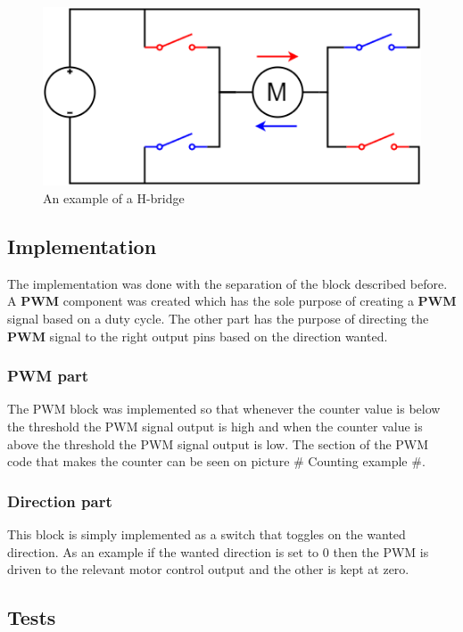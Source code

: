 \begin{figure}[h!]
\centering
\includegraphics[scale=0.5]{Billeder/H-bridge.png}
\caption{ An example of a H-bridge }
\label{fig:H-bridge}
\end{figure}

\subsection{Implementation}

The implementation was done with the separation of the block described before. A \textbf{PWM} component was created which has the sole purpose of creating a \textbf{PWM} signal based on a duty cycle. The other part has the purpose of directing the \textbf{PWM} signal to the right output pins based on the direction wanted.

\subsubsection{PWM part}

The PWM block was implemented so that whenever the counter value is below the threshold the PWM signal output is high and when the counter value is above the threshold the PWM signal output is low. The section of the PWM code that makes the counter can be seen on picture \# Counting example \#.


\subsubsection{Direction part}

This block is simply implemented as a switch that toggles on the wanted direction. As an example if the wanted direction is set to 0 then the PWM is driven to the relevant motor control output and the other is kept at zero.

\subsection{Tests}

